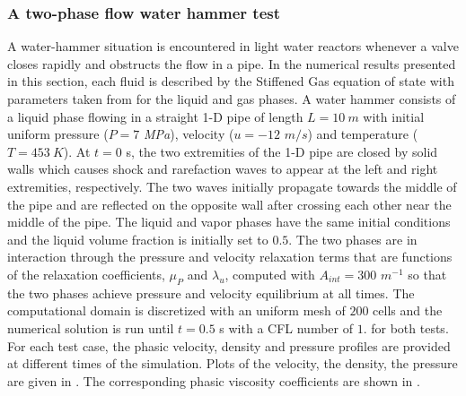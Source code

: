 \documentclass[preprint,10pt]{elsarticle}
\begin{document}
\subsubsection{A two-phase flow water hammer test}\label{sec:water-hammer}
%
A water-hammer situation is encountered in light water reactors whenever a valve closes rapidly and obstructs the flow in a pipe. In the numerical results presented in this section, each fluid is described by the Stiffened Gas equation of state with parameters taken from  for the liquid and gas phases. 
A water hammer consists of a liquid phase flowing in a straight 1-D pipe of length $L=10 \ m$ with initial uniform pressure ($P = 7$ {\it MPa}), velocity ($u = -12$ $m/s$) and temperature ($T = 453 \ K$). At $t=0$ s, the two extremities of the 1-D pipe are closed by solid walls which causes shock and rarefaction waves to appear at the left and right extremities, respectively. The two waves initially propagate towards the middle of the pipe and are reflected on the opposite wall after crossing each other near the middle of the pipe.
The liquid and vapor phases have the same initial conditions and the liquid volume fraction is initially set to $0.5$. The two phases are in interaction through the pressure and velocity relaxation terms that are functions of the relaxation coefficients, $\mu_P$ and $\lambda_u$, computed with $A_{int} = 300$ $m^{-1}$ so that the two phases achieve pressure and velocity equilibrium at all times.
The computational domain is discretized with an uniform mesh of $200$ cells and the numerical solution is run until $t = 0.5$ s with a CFL number of $1.$ for both tests. For each test case, the phasic velocity, density and pressure profiles are provided at different times of the simulation. Plots of the velocity, the density, the pressure are given in . The corresponding phasic viscosity coefficients are shown in .
%
\end{document}
